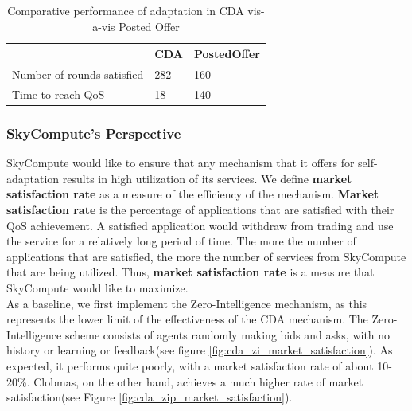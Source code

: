 \documentclass[10pt,journal,compsoc]{IEEEtran}
\begin{document}
\begin{table}[H]\footnotesize
\centering
\begin{tabular}{p{4cm}p{1.2cm}p{1.2cm}}
 \toprule
	& \textbf{CDA} & \textbf{PostedOffer} \\
 \midrule
	Number of rounds satisfied & 282 & \hspace{0.5cm}160 \\ 
	Time to reach QoS & 18 & \hspace{0.5cm}140 \\ 
\bottomrule
\end{tabular}
\caption{Comparative performance of adaptation in CDA vis-a-vis Posted Offer \label{tbl:comparative_performance}}
\end{table}
	
\subsubsection{SkyCompute's Perspective}	
SkyCompute would like to ensure that any mechanism that it offers for self-adaptation results in high utilization of its services. We define \textbf{market satisfaction rate} as a measure of the efficiency of the mechanism. \textbf{Market satisfaction rate} is the percentage of applications that are satisfied with their QoS achievement. A satisfied application would withdraw from trading and use the service for a relatively long period of time. The more the number of applications that are satisfied, the more the number of services from SkyCompute that are being utilized. Thus, \textbf{market satisfaction rate} is a measure that SkyCompute would like to maximize.\\
As a baseline, we first implement the Zero-Intelligence mechanism, as this represents the lower limit of the effectiveness of the CDA mechanism. The Zero-Intelligence scheme consists of agents randomly making bids and asks, with no history or learning or feedback(see figure \ref{fig:cda_zi_market_satisfaction}). As expected, it performs quite poorly, with a market satisfaction rate of about 10-20\%. Clobmas, on the other hand, achieves a much higher rate of market satisfaction(see Figure \ref{fig:cda_zip_market_satisfaction}). 
\end{document}
